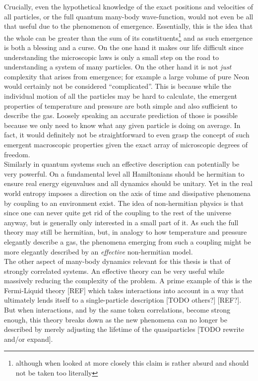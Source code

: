 Crucially, even the hypothetical knowledge of the exact positions and velocities of all particles, or the full quantum many-body wave-function, would not even be all that useful due to the phenomenon of emergence.
Essentially, this is the idea that the whole can be greater than the sum of its constituents\footnote{although when looked at more closely this claim is rather absurd and should not be taken too literally} and as such emergence is both a blessing and a curse.
On the one hand it makes our life difficult since understanding the microscopic laws is only a small step on the road to understanding a system of many particles.
On the other hand it is not \emph{just} complexity that arises from emergence; for example a large volume of pure Neon would certainly not be considered ``complicated''.
This is because while the individual motion of all the particles may be hard to calculate, the emergent properties of temperature and pressure are both simple and also sufficient to describe the gas.
Loosely speaking an accurate prediction of those is possible because we only need to know what any given particle is doing on average.
In fact, it would definitely not be straightforward to even grasp the concept of such emergent macroscopic properties given the exact array of microscopic degrees of freedom.\\
Similarly in quantum systems such an effective description can potentially be very powerful.
On a fundamental level all Hamiltonians should be hermitian to ensure real energy eigenvalues and all dynamics should be unitary.
Yet in the real world entropy imposes a direction on the axis of time and dissipative phenomena by coupling to an environment exist.
The idea of non-hermitian physics is that since one can never quite get rid of the coupling to the rest of the universe anyway, but is generally only interested in a small part of it.
As such the full theory may still be hermitian, but, in analogy to how temperature and pressure elegantly describe a gas, the phenomena emerging from such a coupling might be more elegantly described by an \emph{effective} non-hermitian model.\\
The other aspect of many-body dynamics relevant for this thesis is that of strongly correlated systems.
An effective theory can be very useful while massively reducing the complexity of the problem.
A prime example of this is the Fermi-Liquid theory [REF] which takes interactions into account in a way that ultimately lends itself to a single-particle description [TODO others?] [REF?].
But when interactions, and by the same token correlations, become strong enough, this theory breaks down as the new phenomena can no longer be described by merely adjusting the lifetime of the quasiparticles [TODO rewrite and/or expand].
